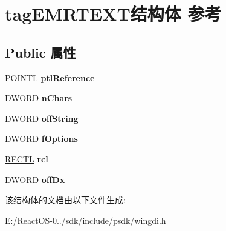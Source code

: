 \hypertarget{structtag_e_m_r_t_e_x_t}{}\section{tag\+E\+M\+R\+T\+E\+X\+T结构体 参考}
\label{structtag_e_m_r_t_e_x_t}
\subsection*{Public 属性}
\begin{DoxyCompactItemize}
\item 
\mbox{\label{structtag_e_m_r_t_e_x_t_a856b7c8eaf0bc2408b7addb53ed1e2af}} 
\hyperlink{struct___p_o_i_n_t_l}{P\+O\+I\+N\+TL} {\bfseries ptl\+Reference}
\item 
\mbox{\label{structtag_e_m_r_t_e_x_t_a38054c211c082e13833d31a275b74a26}} 
D\+W\+O\+RD {\bfseries n\+Chars}
\item 
\mbox{\label{structtag_e_m_r_t_e_x_t_ada1d083411173fe05a140e7374a27a4a}} 
D\+W\+O\+RD {\bfseries off\+String}
\item 
\mbox{\label{structtag_e_m_r_t_e_x_t_a2fbee8affd3cc33082783d8db8be6a6a}} 
D\+W\+O\+RD {\bfseries f\+Options}
\item 
\mbox{\label{structtag_e_m_r_t_e_x_t_a3fce072b559d783f36045e499d8d0f17}} 
\hyperlink{struct___r_e_c_t_l}{R\+E\+C\+TL} {\bfseries rcl}
\item 
\mbox{\label{structtag_e_m_r_t_e_x_t_a3330ef4b06c31c9cd5c3e1cdc2419407}} 
D\+W\+O\+RD {\bfseries off\+Dx}
\end{DoxyCompactItemize}


该结构体的文档由以下文件生成\+:\begin{DoxyCompactItemize}
\item 
E\+:/\+React\+O\+S-\/0../sdk/include/psdk/wingdi.\+h\end{DoxyCompactItemize}
